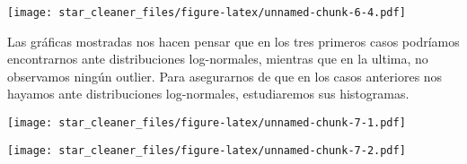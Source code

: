 \documentclass[
]{article}
\newenvironment{Shaded}{\begin{snugshade}}{\end{snugshade}}
\newcommand{\AttributeTok}[1]{\textcolor[rgb]{0.80,0.80,0.80}{#1}}
\newcommand{\ConstantTok}[1]{\textcolor[rgb]{0.86,0.64,0.64}{\textbf{#1}}}
\newcommand{\DecValTok}[1]{\textcolor[rgb]{0.86,0.86,0.80}{#1}}
\newcommand{\FunctionTok}[1]{\textcolor[rgb]{0.94,0.94,0.56}{#1}}
\newcommand{\NormalTok}[1]{\textcolor[rgb]{0.80,0.80,0.80}{#1}}
\newcommand{\SpecialCharTok}[1]{\textcolor[rgb]{0.86,0.64,0.64}{#1}}
\newcommand{\StringTok}[1]{\textcolor[rgb]{0.80,0.58,0.58}{#1}}
\begin{document}
\texttt{[image: star\_cleaner\_files/figure-latex/unnamed-chunk-6-4.pdf]}

Las gráficas mostradas nos hacen pensar que en los tres primeros casos
podríamos encontrarnos ante distribuciones log-normales, mientras que en
la ultima, no observamos ningún outlier. Para asegurarnos de que en los
casos anteriores nos hayamos ante distribuciones log-normales,
estudiaremos sus histogramas.

\begin{Shaded}
\end{Shaded}

\texttt{[image: star\_cleaner\_files/figure-latex/unnamed-chunk-7-1.pdf]}

\begin{Shaded}
\end{Shaded}

\texttt{[image: star\_cleaner\_files/figure-latex/unnamed-chunk-7-2.pdf]}

\begin{Shaded}
\end{Shaded}
\end{document}
